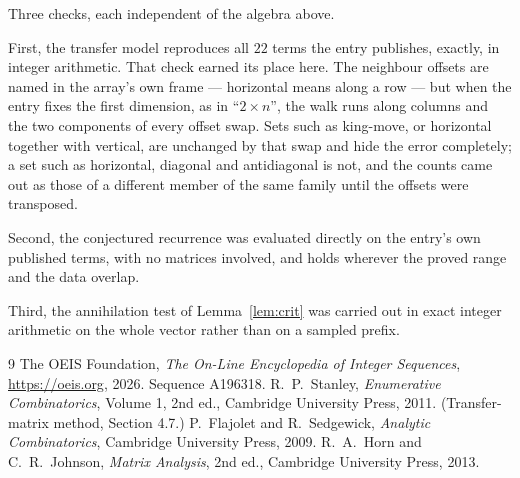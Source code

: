 \documentclass[11pt,a4paper]{article}
\theoremstyle{plain}
\theoremstyle{definition}
\begin{document}
Three checks, each independent of the algebra above.

First, the transfer model reproduces all $22$ terms the entry publishes, exactly, in
integer arithmetic. That check earned its place here. The neighbour offsets are named in the
array's own frame --- horizontal means along a row --- but when the entry fixes the first
dimension, as in ``$2\times n$'', the walk runs along columns and the two components of every
offset swap. Sets such as king-move, or horizontal together with vertical, are unchanged by
that swap and hide the error completely; a set such as horizontal, diagonal and antidiagonal
is not, and the counts came out as those of a different member of the same family until the
offsets were transposed.

Second, the conjectured recurrence was evaluated directly on the entry's own published terms,
with no matrices involved, and holds wherever the proved range and the data overlap.

Third, the annihilation test of Lemma~\ref{lem:crit} was carried out in exact integer
arithmetic on the whole vector rather than on a sampled prefix.

\begin{thebibliography}{9}
 The OEIS Foundation, \emph{The On-Line Encyclopedia of Integer
Sequences}, \url{https://oeis.org}, 2026. Sequence A196318.
 R.~P.~Stanley, \emph{Enumerative Combinatorics}, Volume 1, 2nd ed.,
Cambridge University Press, 2011. (Transfer-matrix method, Section 4.7.)
 P.~Flajolet and R.~Sedgewick, \emph{Analytic Combinatorics}, Cambridge
University Press, 2009.
 R.~A.~Horn and C.~R.~Johnson, \emph{Matrix Analysis}, 2nd ed., Cambridge
University Press, 2013.
\end{thebibliography}
\end{document}

